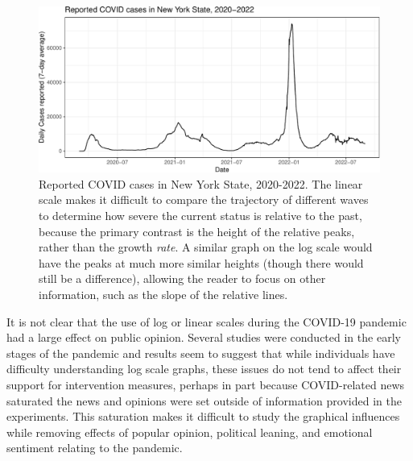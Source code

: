 \documentclass[article]{jdssv}\usepackage[]{graphicx}\usepackage[]{xcolor}
\newenvironment{knitrout}{}{} %
\begin{document}
\begin{knitrout}\footnotesize
{}\color{fgcolor}\begin{figure}

{\centering \includegraphics[width=.8\linewidth]{Figures_R/fig-linear-scales-ref-lines-1} 

}

\caption[Reported COVID cases in New York State, 2020-2022]{Reported COVID cases in New York State, 2020-2022. The linear scale makes it difficult to compare the trajectory of different waves to determine how severe the current status is relative to the past, because the primary contrast is the height of the relative peaks, rather than the growth \emph{rate}. A similar graph on the log scale would have the peaks at much more similar heights (though there would still be a difference), allowing the reader to focus on other information, such as the slope of the relative lines.}\label{fig:linear-scales-ref-lines}
\end{figure}

\end{knitrout}



It is not clear that the use of log or linear scales during the COVID-19 pandemic had a large effect on public opinion. Several studies were conducted in the early stages of the pandemic \citep{romanoScaleCOVID19Graphs2020, seviLogarithmicLinearVisualizations2020, ryanGraphsLogarithmicAxes2020} and results seem to suggest that while individuals have difficulty understanding log scale graphs, these issues do not tend to affect their support for intervention measures, perhaps in part because COVID-related news saturated the news and opinions were set outside of information provided in the experiments. This saturation makes it difficult to study the graphical influences while removing effects of popular opinion, political leaning, and emotional sentiment relating to the pandemic. 
\end{document}
